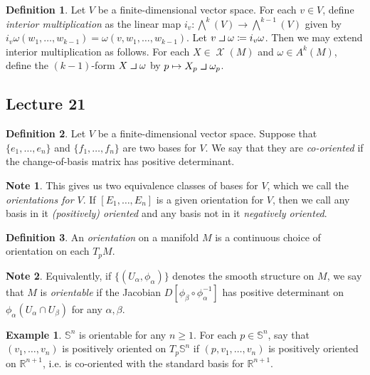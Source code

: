 \documentclass[10pt,letterpaper,cm]{nupset}
\theoremstyle{definition}
\newtheorem*{definition}{Definition}
\newtheorem{exmp}{Example}
\newtheorem*{note}{Note}
\newcommand{\R}{\mathbb R}
\renewcommand{\S}{\mathbb S}
\newcommand{\1}{\mathbf{1}}
\newcommand{\0}{\vec 0}
\newcommand{\intprodl}{%
    \mathbin{\scalebox{1.5}{$\lrcorner$}}%
}
\DeclareMathOperator{\vf}{\mathscr{X}}
\begin{document}
\begin{definition}
Let $V$ be a finite-dimensional vector space. For each $v\in V$, define \textit{interior multiplication} as the linear map $i_v: \bigwedge^k(V) \to \bigwedge^{k-1}(V)$ given by $i_v \omega(w_1, \ldots, w_{k-1})= \omega(v, w_1, \ldots, w_{k-1}).$ Let $v \intprodl \omega \coloneqq  i_v \omega$. Then we may extend interior multiplication as follows. For each $X \in \vf(M)$ and $\omega \in A^k(M)$, define the $(k-1)$-form $X \intprodl \omega$ by $p\mapsto  X_p \intprodl \omega_p$.
\end{definition}

\subsection{Lecture 21}

\begin{definition}
Let $V$ be a finite-dimensional vector space. Suppose that $\{e_1, \ldots, e_n\}$ and $\{f_1, \ldots, f_n\}$ are two bases for $V$. We say that they are \textit{co-oriented} if the change-of-basis matrix  has positive determinant.
\begin{note}
This gives us two equivalence classes of bases for $V$, which we call the \textit{orientations for $V$}. If $[E_1, \ldots, E_n]$ is a given orientation for $V$, then we call any basis in it \textit{(positively) oriented} and any basis not in it \textit{negatively oriented}.
\end{note}
\end{definition}

\begin{definition}
An \textit{orientation} on a manifold $M$ is a continuous choice of orientation on each $T_pM$. 
\end{definition}
\begin{note}
Equivalently, if $\{(U_{\alpha}, \phi_{\alpha})\}$ denotes the smooth structure on $M$, we say that $M$ is \textit{orientable} if the Jacobian $D[\phi_{\beta} \circ \phi_{\alpha}^{-1}]$ has positive determinant on $\phi_{\alpha}(U_{\alpha}\cap U_{\beta})$ for any $\alpha, \beta$.
\end{note}

\begin{exmp}
$\S^n$ is orientable for any $n\geq 1$. For each $p \in \S^n$, say that $(v_1, \ldots, v_n)$ is positively oriented on $T_p\S^n$ if $(p, v_1, \ldots, v_n)$ is positively oriented on $\R^{n+1}$, i.e. is co-oriented with the standard basis for $\R^{n+1}$.
\end{exmp}
\end{document}
